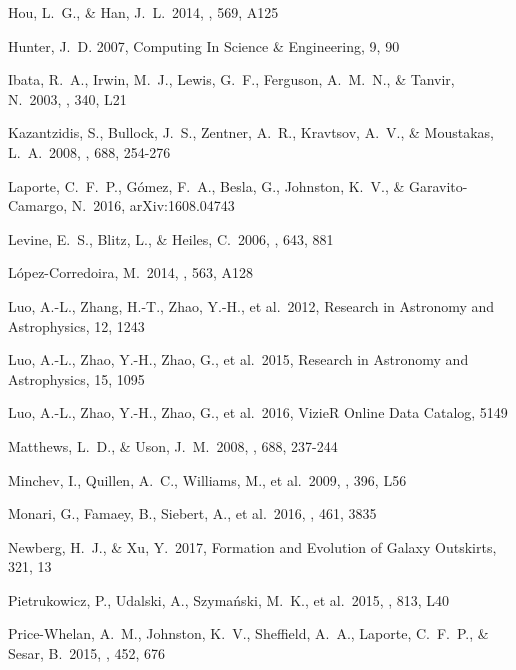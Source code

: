 \documentclass[11pt,preprint]{aastex6}
\begin{document}
\begin{thebibliography}{}
 Hou, L.~G., \& Han, J.~L.\ 2014, \aap, 569, A125

Hunter, J.~D. 2007, Computing In Science \& Engineering, 9, 90

 Ibata, R.~A., Irwin, M.~J., Lewis, G.~F., Ferguson, A.~M.~N., \& Tanvir, N.\ 2003, \mnras, 340, L21

 Kazantzidis, S., Bullock, J.~S., Zentner, A.~R., Kravtsov, A.~V., \& Moustakas, L.~A.\ 2008, \apj, 688, 254-276 

 Laporte, C.~F.~P., G{\'o}mez, F.~A., Besla, G., Johnston, K.~V., \& Garavito-Camargo, N.\ 2016, arXiv:1608.04743

 Levine, E.~S., Blitz, L., \& Heiles, C.\ 2006, \apj, 643, 881

 L{\'o}pez-Corredoira, M.\ 2014, \aap, 563, A128

 Luo, A.-L., Zhang, H.-T., Zhao, Y.-H., et al.\ 2012, Research in Astronomy and Astrophysics, 12, 1243

 Luo, A.-L., Zhao, Y.-H., Zhao, G., et al.\ 2015, Research in Astronomy and Astrophysics, 15, 1095

 Luo, A.-L., Zhao, Y.-H., Zhao, G., et al.\ 2016, VizieR Online Data Catalog, 5149

 Matthews, L.~D., \& Uson, J.~M.\ 2008, \apj, 688, 237-244

 Minchev, I., Quillen, A.~C., Williams, M., et al.\ 2009, \mnras, 396, L56 

 Monari, G., Famaey, B., Siebert, A., et al.\ 2016, \mnras, 461, 3835

 Newberg, H.~J., \& Xu, Y.\ 2017, Formation and Evolution of Galaxy Outskirts, 321, 13

 Pietrukowicz, P., Udalski, A., Szyma{\'n}ski, M.~K., et al.\ 2015, \apjl, 813, L40

 Price-Whelan, A.~M., Johnston, K.~V., Sheffield, A.~A., Laporte, C.~F.~P., \& Sesar, B.\ 2015, \mnras, 452, 676


\end{thebibliography}
\end{document}
